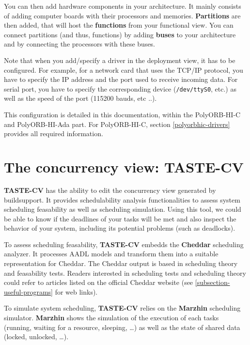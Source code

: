 \documentclass[11pt]{book}
\newcommand{\Concept}[1]{#1\xspace}
\newcommand{\aadl}{\Concept{AADL}}
\begin{document}
   \centerline{}

   You can then add hardware components in your architecture. It mainly
   consists of adding computer boards with their processors and memories.
   \textbf{Partitions} are then added, that will host the \textbf{functions} from
   your functional view. You can connect partitions (and thus, functions) by
   adding \textbf{buses} to your architecture and by connecting the processors
   with these buses.

   \centerline{}

   Note that when you add/specify a driver in the deployment view, it has to be
   configured. For example, for a network card that uses the TCP/IP protocol,
   you have to specify the IP address and the port used to receive incoming
   data. For serial port, you have to specify the corresponding device
   (\texttt{/dev/ttyS0}, etc.) as well as the speed of the port (115200 bauds,
   etc ..).

   This configuration is detailed in this documentation, within the PolyORB-HI-C
   and PolyORB-HI-Ada part. For PolyORB-HI-C, section \ref{polyorbhic-drivers}
   provides all required information.

   \section{The concurrency view: TASTE-CV}
   \textbf{TASTE-CV} has the ability to edit the concurrency view generated by buildsupport.
   It provides schedulability analysis functionalities to assess system
   scheduling feasability as well as scheduling simulation. Using this tool, we
   could be able to know if the deadlines of your tasks will be met and also
   inspect the behavior of your system, including its potential problems (such
   as deadlocks).

   To assess scheduling feasability, \textbf{TASTE-CV} embedds the
   \textbf{Cheddar} scheduling analyzer. It processes \aadl models and transform
   them into a suitable representation for Cheddar. The Cheddar output is based
   in scheduling theory and feasability tests. Readers interested in scheduling
   tests and scheduling theory could refer to articles listed on the official
   Cheddar website (see \ref{subsection-useful-programs} for web links).

   To simulate system scheduling, \textbf{TASTE-CV} relies on the \textbf{Marzhin}
   scheduling simulator. \textbf{Marzhin} shows the simulation of the execution
   of each tasks (running, waiting for a resource, sleeping, \ldots)
   as well as the state of shared data (locked, unlocked, \ldots).
  
\end{document}
